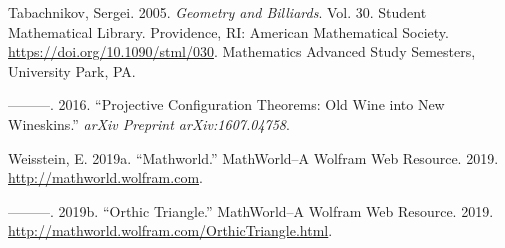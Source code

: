 \documentclass[]{article}
\begin{document}
\leavevmode\hypertarget{ref-sergei91}{}%
Tabachnikov, Sergei. 2005. \emph{Geometry and Billiards}. Vol. 30. Student Mathematical Library. Providence, RI: American Mathematical Society. \url{https://doi.org/10.1090/stml/030}. Mathematics Advanced Study Semesters, University Park, PA.

\leavevmode\hypertarget{ref-sergei2016proj}{}%
---------. 2016. ``Projective Configuration Theorems: Old Wine into New Wineskins.'' \emph{arXiv Preprint arXiv:1607.04758}.

\leavevmode\hypertarget{ref-mw}{}%
Weisstein, E. 2019a. ``Mathworld.'' MathWorld--A Wolfram Web Resource. 2019. \url{http://mathworld.wolfram.com}.

\leavevmode\hypertarget{ref-mw_orthic}{}%
---------. 2019b. ``Orthic Triangle.'' MathWorld--A Wolfram Web Resource. 2019. \url{http://mathworld.wolfram.com/OrthicTriangle.html}.
\end{document}
